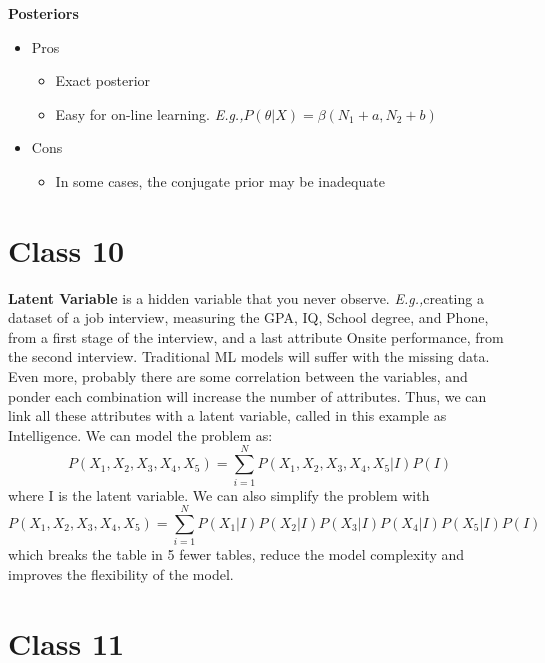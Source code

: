 \documentclass{article}
\newcommand{\Eg}{\textit{E.g.,}}
\begin{document}
\textbf{Posteriors}
\begin{itemize}
    \item Pros \begin{itemize}
        \item Exact posterior
        \item Easy for on-line learning. \Eg $P(\theta|X) = \beta(N_1 + a, N_2 + b)$
    \end{itemize}
    
    \item Cons \begin{itemize}
        \item In some cases, the conjugate prior may be inadequate
    \end{itemize}
\end{itemize}

\section{Class 10}
\textbf{Latent Variable} is a hidden variable that you never observe.
\Eg creating a dataset of a job interview, measuring the GPA, IQ, School degree, and Phone, from a first stage of the interview, and a last attribute Onsite performance, from the second interview. Traditional ML models will suffer with the missing data. Even more, probably there are some correlation between the variables, and ponder each combination will increase the number of attributes. Thus, we can link all these attributes with a latent variable, called in this example as Intelligence. We can model the problem as:
\begin{equation}
    P(X_1, X_2, X_3, X_4, X_5) = \sum_{i=1}^N P(X_1, X_2, X_3, X_4, X_5|I)P(I)
\end{equation}
where I is the latent variable. We can also simplify the problem with
\begin{equation}
    P(X_1, X_2, X_3, X_4, X_5) = \sum_{i=1}^N P(X_1|I)P(X_2|I)P(X_3|I)P(X_4|I)P(X_5|I)P(I)
\end{equation}
which breaks the table in 5 fewer tables, reduce the model complexity and improves the flexibility of the model.


\section{Class 11}
\end{document}
